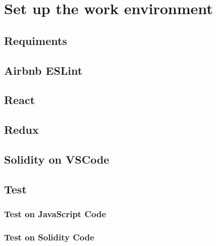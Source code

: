 \documentclass[ManualeSviluppatore.tex]{subfiles}
\begin{document}
\chapter{Set up the work environment}
\section{Requiments}
\section{Airbnb ESLint}
\section{React}
\section{Redux}
\section{Solidity on VSCode}
\section{Test}
\subsection{Test on JavaScript Code}
\subsection{Test on Solidity Code}
\end{document}
